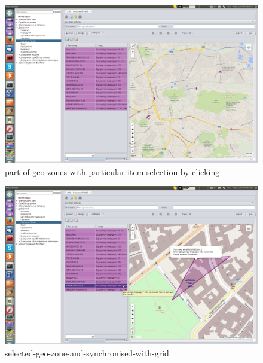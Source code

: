 \begin{figure}[!htp]
\centering
\includegraphics[width=16cm]{chapters/01-geozones/images/03-part-of-geo-zones-with-particular-item-selection-by-clicking.png}
\caption{part-of-geo-zones-with-particular-item-selection-by-clicking}\label{fig:03}
\end{figure}

\begin{figure}[!htp]
\centering
\includegraphics[width=16cm]{chapters/01-geozones/images/04-selected-geo-zone-and-synchronised-with-grid.png}
\caption{selected-geo-zone-and-synchronised-with-grid}\label{fig:04}
\end{figure}

